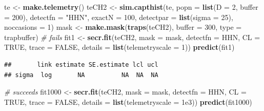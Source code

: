 \documentclass[
]{book}
\newenvironment{Shaded}{\begin{snugshade}}{\end{snugshade}}
\newcommand{\AttributeTok}[1]{\textcolor[rgb]{0.13,0.29,0.53}{#1}}
\newcommand{\CommentTok}[1]{\textcolor[rgb]{0.56,0.35,0.01}{\textit{#1}}}
\newcommand{\ConstantTok}[1]{\textcolor[rgb]{0.56,0.35,0.01}{#1}}
\newcommand{\DecValTok}[1]{\textcolor[rgb]{0.00,0.00,0.81}{#1}}
\newcommand{\FloatTok}[1]{\textcolor[rgb]{0.00,0.00,0.81}{#1}}
\newcommand{\FunctionTok}[1]{\textcolor[rgb]{0.13,0.29,0.53}{\textbf{#1}}}
\newcommand{\NormalTok}[1]{#1}
\newcommand{\OtherTok}[1]{\textcolor[rgb]{0.56,0.35,0.01}{#1}}
\newcommand{\StringTok}[1]{\textcolor[rgb]{0.31,0.60,0.02}{#1}}
\begin{document}
\begin{Shaded}
\begin{Highlighting}[]
\NormalTok{te }\OtherTok{\textless{}{-}} \FunctionTok{make.telemetry}\NormalTok{()}
\NormalTok{teCH2 }\OtherTok{\textless{}{-}} \FunctionTok{sim.capthist}\NormalTok{(te, }\AttributeTok{popn =} \FunctionTok{list}\NormalTok{(}\AttributeTok{D =} \DecValTok{2}\NormalTok{, }\AttributeTok{buffer =} \DecValTok{200}\NormalTok{), }
    \AttributeTok{detectfn =} \StringTok{"HHN"}\NormalTok{, }\AttributeTok{exactN =} \DecValTok{100}\NormalTok{, }\AttributeTok{detectpar =} \FunctionTok{list}\NormalTok{(}\AttributeTok{sigma =} \DecValTok{25}\NormalTok{),}
    \AttributeTok{noccasions =} \DecValTok{1}\NormalTok{)}
\NormalTok{mask }\OtherTok{\textless{}{-}} \FunctionTok{make.mask}\NormalTok{(}\FunctionTok{traps}\NormalTok{(teCH2), }\AttributeTok{buffer =} \DecValTok{300}\NormalTok{, }\AttributeTok{type =} 
    \StringTok{\textquotesingle{}trapbuffer\textquotesingle{}}\NormalTok{)}
\CommentTok{\# fails}
\NormalTok{fit1 }\OtherTok{\textless{}{-}} \FunctionTok{secr.fit}\NormalTok{(teCH2, }\AttributeTok{mask =}\NormalTok{ mask, }\AttributeTok{detectfn =} \StringTok{\textquotesingle{}HHN\textquotesingle{}}\NormalTok{, }\AttributeTok{CL =} \ConstantTok{TRUE}\NormalTok{, }
    \AttributeTok{trace =} \ConstantTok{FALSE}\NormalTok{, }\AttributeTok{details =} \FunctionTok{list}\NormalTok{(}\AttributeTok{telemetryscale =} \DecValTok{1}\NormalTok{)) }
\FunctionTok{predict}\NormalTok{(fit1)}
\end{Highlighting}
\end{Shaded}

\begin{verbatim}
##       link estimate SE.estimate lcl ucl
## sigma  log       NA          NA  NA  NA
\end{verbatim}

\begin{Shaded}
\begin{Highlighting}[]
\CommentTok{\# succeeds}
\NormalTok{fit1000 }\OtherTok{\textless{}{-}} \FunctionTok{secr.fit}\NormalTok{(teCH2, }\AttributeTok{mask =}\NormalTok{ mask, }\AttributeTok{detectfn =} \StringTok{\textquotesingle{}HHN\textquotesingle{}}\NormalTok{, }
    \AttributeTok{CL =} \ConstantTok{TRUE}\NormalTok{, }\AttributeTok{trace =} \ConstantTok{FALSE}\NormalTok{, }\AttributeTok{details =} \FunctionTok{list}\NormalTok{(}\AttributeTok{telemetryscale =} 
    \FloatTok{1e3}\NormalTok{)) }
\FunctionTok{predict}\NormalTok{(fit1000)}
\end{Highlighting}
\end{Shaded}
\end{document}
